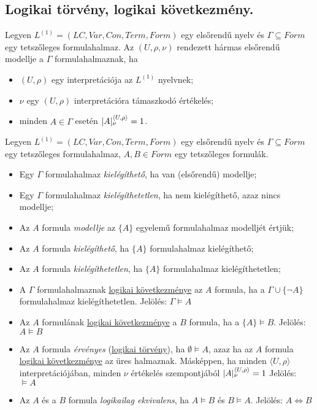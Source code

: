 \subsection{Logikai törvény, logikai következmény.}
\begin{definition}[modell]
	Legyen $L^{(1)} = (LC, Var, Con, Term, Form)$ egy elsőrendű nyelv és $\Gamma \subseteq Form$ egy tetszőleges formulahalmaz. Az $(U, \rho, \nu)$ rendezett hármas elsőrendű modellje a $\Gamma$ formulahalmaznak, ha 
	\begin{itemize}
		\item  $(U, \rho)$ egy interpretációja az $L^{(1)}$ nyelvnek; 
		\item  $\nu$ egy $(U, \rho)$ interpretációra támaszkodó értékelés; 
		\item  minden  $A \in \Gamma$ esetén $|A|^{\langle U, \rho \rangle}_{\nu} = 1$.
	\end{itemize}
	
\end{definition}
\begin{definition}
	Legyen $L^{(1)} = (LC, Var, Con, Term, Form)$ egy elsőrendű nyelv és $\Gamma \subseteq Form$ egy tetszőleges formulahalmaz, $A,B \in Form$ egy tetszőleges formulák.
	\begin{itemize}
		\item Egy $\Gamma$ formulahalmaz \emph{kielégíthető}, ha van (elsőrendű) modellje;
		\item Egy $\Gamma$ formulahalmaz \emph{kielégíthetetlen}, ha nem kielégíthető, azaz nincs modellje;
		\item Az $A$ formula \emph{modellje} az $\{A\}$ egyelemű formulahalmaz modelljét értjük;
		\item Az $A$ formula \emph{kielégíthető}, ha $\{A\}$ formulahalmaz kielégíthető;
		\item Az $A$ formula \emph{kielégíthetetlen}, ha $\{A\}$ formulahalmaz kielégíthetetlen;
		\item A  $\Gamma$ formulahalmaznak \underline{logikai következménye} az $A$ formula, ha a $\Gamma \cup \{\neg A\}$ formulahalmaz kielégíthetetlen. Jelölés: $\Gamma \models A$ 
		\item Az $A$ formulának \underline{logikai következménye} a $B$ formula, ha a $\{A\} \models B$. Jelölés: $A \models B$ 
		\item Az $A$ formula \emph{érvényes} (\underline{logikai törvény})\label{def:logikai törvény}, ha $\emptyset \models A$, azaz ha az $A$ formula \underline{logikai következménye} az üres halmaznak. Másképpen, ha minden $ \langle U, \rho \rangle$ interpretációjában, minden $\nu$ értékelés szempontjából $|A|^{\langle U, \rho \rangle}_{\nu} = 1$ Jelölés: $\models A$
		\item Az $A$ és a $B$ formula \emph{logikailag ekvivalens}, ha $A \models B$ és $B \models A$. Jelölés: $A \Leftrightarrow B$ 
	\end{itemize}
\end{definition}

